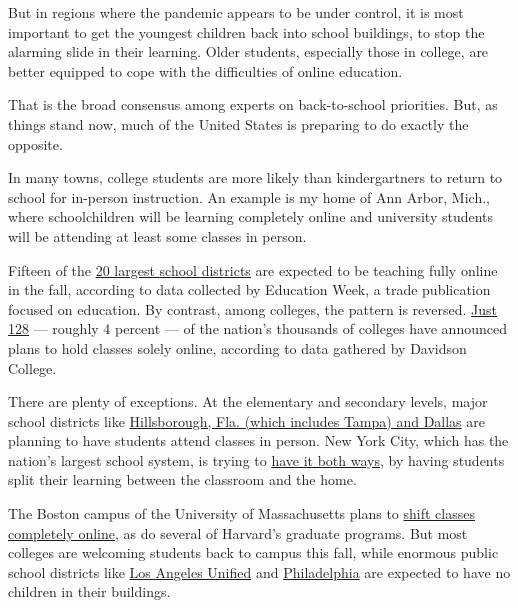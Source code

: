 But in regions where the pandemic appears to be under control, it is
most important to get the youngest children back into school buildings,
to stop the alarming slide in their learning. Older students, especially
those in college, are better equipped to cope with the difficulties of
online education.

That is the broad consensus among experts on back-to-school priorities.
But, as things stand now, much of the United States is preparing to do
exactly the opposite.

In many towns, college students are more likely than kindergartners to
return to school for in-person instruction. An example is my home of Ann
Arbor, Mich., where schoolchildren will be learning completely online
and university students will be attending at least some classes in
person.

Fifteen of the
\href{https://www.edweek.org/ew/section/multimedia/school-districts-reopening-plans-a-snapshot.html}{20
largest school districts} are expected to be teaching fully online in
the fall, according to data collected by Education Week, a trade
publication focused on education. By contrast, among colleges, the
pattern is reversed.
\href{https://collegecrisis.shinyapps.io/dashboard/}{Just 128} ---
roughly 4 percent --- of the nation's thousands of colleges have
announced plans to hold classes solely online, according to data
gathered by Davidson College.

There are plenty of exceptions. At the elementary and secondary levels,
major school districts like
\href{https://www.edweek.org/ew/section/multimedia/school-districts-reopening-plans-a-snapshot.html}{Hillsborough,
Fla. (which includes Tampa) and Dallas} are planning to have students
attend classes in person. New York City, which has the nation's largest
school system, is trying to
\href{https://www.schools.nyc.gov/school-year-20-21/return-to-school-2020/welcome-to-the-2020-2021-school-year}{have
it both ways}, by having students split their learning between the
classroom and the home.

The Boston campus of the University of Massachusetts plans to
\href{https://www.masslive.com/news/2020/07/here-are-the-fall-reopening-plans-for-the-25-largest-colleges-in-mass.html}{shift
classes completely online}, as do several of Harvard's graduate
programs. But most colleges are welcoming students back to campus this
fall, while enormous public school districts like
\href{https://achieve.lausd.net/site/default.aspx?PageType=3\&DomainID=4\&ModuleInstanceID=4466\&ViewID=6446EE88-D30C-497E-9316-3F8874B3E108\&RenderLoc=0\&FlexDataID=91406\&PageID=1}{Los
Angeles Unified} and
\href{https://www.philasd.org/coronavirus/schoolstart2020/}{Philadelphia}
are expected to have no children in their buildings.

